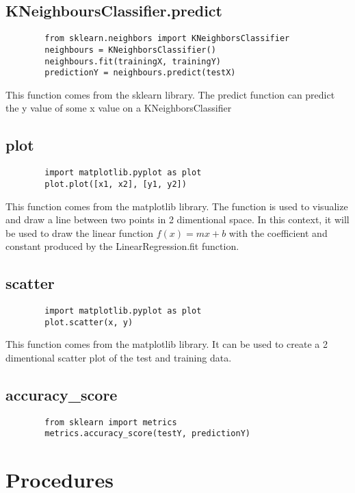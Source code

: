 \documentclass[titlepage, 11pt]{article}
\begin{document}
	\subsection{KNeighboursClassifier.predict}
	
	\begin{lstlisting}
		from sklearn.neighbors import KNeighborsClassifier
		neighbours = KNeighborsClassifier()
		neighbours.fit(trainingX, trainingY)
		predictionY = neighbours.predict(testX)
	\end{lstlisting}
	This function comes from the sklearn library. The predict function can predict the y value of some x value on a KNeighborsClassifier 
	\subsection{plot}
	
	\begin{lstlisting}
		import matplotlib.pyplot as plot
		plot.plot([x1, x2], [y1, y2])
	\end{lstlisting}
	This function comes from the matplotlib library. The function is used to visualize and draw a line between two points in 2 dimentional space. In this context, it will be used to draw the linear function $ f(x) = mx + b $ with the coefficient and constant produced by the LinearRegression.fit function.
	
	\subsection{scatter}
	
	\begin{lstlisting}
		import matplotlib.pyplot as plot
		plot.scatter(x, y)
	\end{lstlisting}
	This function comes from the matplotlib library. It can be used to create a 2 dimentional scatter plot of the test and training data.
	
	\subsection{accuracy\_score}
	\begin{lstlisting}
		from sklearn import metrics
		metrics.accuracy_score(testY, predictionY)
	\end{lstlisting}
	
	\section{Procedures}
	
\end{document}
